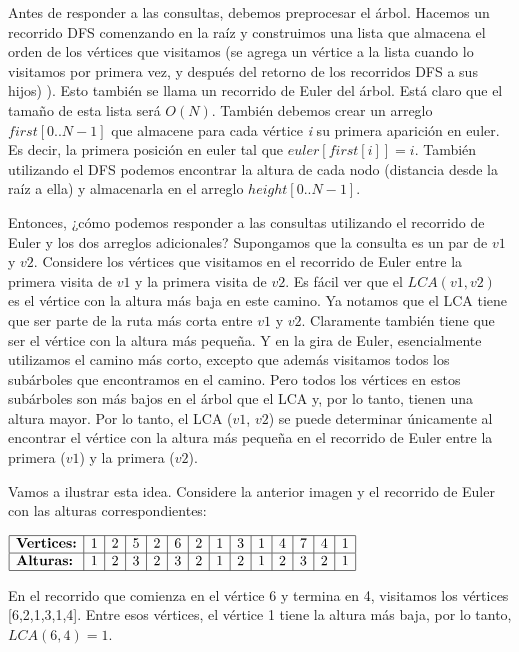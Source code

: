 Antes de responder a las consultas, debemos preprocesar el árbol. Hacemos un recorrido DFS comenzando en la raíz y construimos una lista que almacena el orden de los vértices que visitamos (se agrega un vértice a la lista cuando lo visitamos por primera vez, y después del retorno de los recorridos DFS a sus hijos) ). Esto también se llama un recorrido de Euler del árbol. Está claro que el tamaño de esta lista será $O(N)$. También debemos crear un arreglo $first[0..N-1]$ que almacene para cada vértice {\em i} su primera aparición en euler. Es decir, la primera posición en euler tal que $euler [first[i]] = i$. También utilizando el DFS podemos encontrar la altura de cada nodo (distancia desde la raíz a ella) y almacenarla en el arreglo $height[0..N-1]$.

Entonces, ¿cómo podemos responder a las consultas utilizando el recorrido de Euler y los dos arreglos adicionales? Supongamos que la consulta es un par de $v1$ y $v2$. Considere los vértices que visitamos en el recorrido de Euler entre la primera visita de $v1$ y la primera visita de $v2$. Es fácil ver que el $LCA (v1, v2)$ es el vértice con la altura más baja en este camino. Ya notamos que el LCA tiene que ser parte de la ruta más corta entre $v1$ y $v2$. Claramente también tiene que ser el vértice con la altura más pequeña. Y en la gira de Euler, esencialmente utilizamos el camino más corto, excepto que además visitamos todos los subárboles que encontramos en el camino. Pero todos los vértices en estos subárboles son más bajos en el árbol que el LCA y, por lo tanto, tienen una altura mayor. Por lo tanto, el LCA ($v1$, $v2$) se puede determinar únicamente al encontrar el vértice con la altura más pequeña en el recorrido de Euler entre la primera ($v1$) y la primera ($v2$).

Vamos a ilustrar esta idea. Considere la anterior imagen y el recorrido de Euler con las alturas correspondientes:



$\begin{array}{|l|c|c|c|c|c|c|c|c|c|c|c|c|c|}
	\hline
	\textbf{Vertices:}   & 1 & 2 & 5 & 2 & 6 & 2 & 1 & 3 & 1 & 4 & 7 & 4 & 1 \\ \hline
	\textbf{Alturas:} & 1 & 2 & 3 & 2 & 3 & 2 & 1 & 2 & 1 & 2 & 3 & 2 & 1 \\ \hline
\end{array}$



En el recorrido que comienza en el vértice 6 y termina en 4, visitamos los vértices [6,2,1,3,1,4]. Entre esos vértices, el vértice 1 tiene la altura más baja, por lo tanto, $LCA (6, 4) = 1$.

